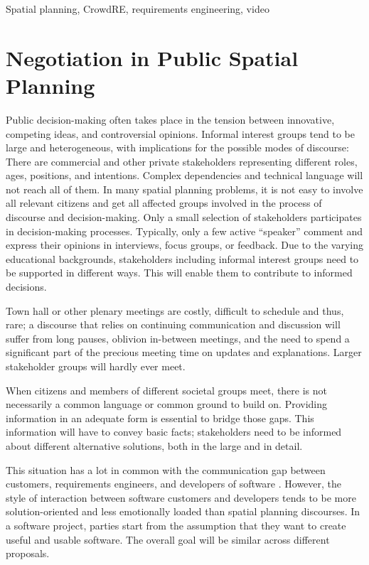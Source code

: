 \documentclass[conference]{IEEEtran}
\begin{document}
\begin{IEEEkeywords}
	Spatial planning, CrowdRE, requirements engineering, video
\end{IEEEkeywords}

\IEEEpeerreviewmaketitle

\section{Negotiation in Public Spatial Planning}
Public decision-making often takes place in the tension between innovative, 
competing ideas, and controversial opinions. Informal interest groups tend to 
be large and heterogeneous, with implications for the possible modes of 
discourse: There are commercial and other private stakeholders representing 
different roles, ages, positions, and intentions. Complex dependencies and 
technical language will not reach all of them. In many spatial planning 
problems, it is not easy to involve all relevant citizens and get all affected 
groups involved in the process of discourse and decision-making. Only a small 
selection of stakeholders participates in decision-making processes. Typically, 
only a few active ``speaker'' comment and express their opinions in interviews, 
focus groups, or feedback. Due to the varying educational backgrounds, 
stakeholders including informal interest groups need to be supported in 
different ways. This will enable them to contribute to informed decisions. 

Town hall or other plenary meetings are costly, difficult to schedule and thus, 
rare; a discourse that relies on continuing communication and discussion will 
suffer from long pauses, oblivion in-between meetings, and the need to spend a 
significant part of the precious meeting time on updates and explanations. 
Larger stakeholder groups will hardly ever meet.

When citizens and members of different societal groups meet, there is not 
necessarily a common language or common ground to build on. Providing 
information in an adequate form is essential to bridge those gaps. This 
information will have to convey basic facts; stakeholders need to be informed 
about different alternative solutions, both in the large and in detail. 

This situation has a lot in common with the communication gap between 
customers, requirements engineers, and developers of software 
\cite{Jackson.1995}. However, the style of interaction between software 
customers and developers tends to be more solution-oriented and less 
emotionally loaded than spatial planning discourses. In a software project, 
parties start from the assumption that they want to create useful and usable 
software. The overall goal will be similar across different proposals.
\end{document}
